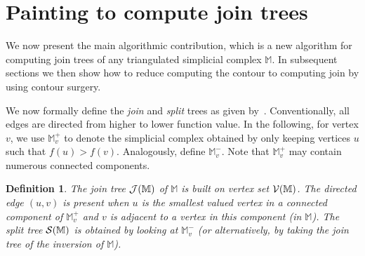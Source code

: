 \documentclass[11pt]{article}
\newtheorem{definition}[theorem]{Definition}
\theoremstyle{definition}
\newcommand{\cJ}{{\cal J}}
\newcommand{\cS}{{\cal S}}
\newcommand{\cV}{{\cal V}}
\newcommand{\MM}{\mathbb{M}}
\begin{document}





\section{Painting to compute join trees}
\label{sec:paint}

We now present the main algorithmic contribution, which is a new algorithm for computing join trees of any triangulated simplicial
complex $\MM$.  In subsequent sections we then show how to reduce computing the contour to computing join by using contour surgery.

We now formally define the \emph{join} and \emph{split} trees as given by~\cite{csa-cctad-03}.
Conventionally, all edges are directed from higher to lower function value. 
In the following, for vertex $v$, we use $\MM^+_v$ to denote the simplicial complex obtained by only
keeping vertices $u$ such that $f(u) > f(v)$. Analogously, define $\MM^-_v$. Note that $\MM^+_v$ may contain
numerous connected components. 

\begin{definition} \label{def:join} The \emph{join tree} $\cJ(\MM)$ of $\MM$ is built on vertex set $\cV(\MM)$.
The directed edge $(u,v)$ is present when $u$ is the smallest valued vertex in a connected component of $\MM^+_v$
\emph{and} $v$ is adjacent to a vertex in this component (in $\MM$). The \emph{split tree} $\cS(\MM)$ is obtained
by looking at $\MM^-_v$ (or alternatively, by taking the join tree of the inversion of $\MM$). 
\end{definition}
\end{document}
